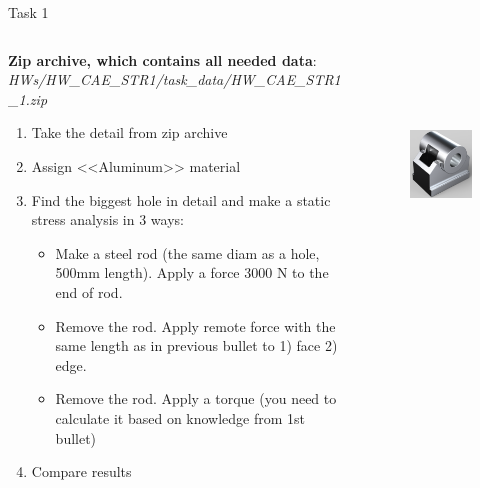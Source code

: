 \documentclass[aspectratio=169]{beamer}
\begin{document}
\begin{frame}[t]{Task 1}
    \vspace{-0.4cm}
    \begin{columns}[T,onlytextwidth]
        \begin{column}{0.59\textwidth}
            \scriptsize
            \textbf{Zip archive, which contains all needed data}: \textit{HWs/HW\_CAE\_STR1/task\_data/HW\_CAE\_STR1\_1.zip}
            \begin{enumerate}
                \item Take the detail from zip archive
                \item Assign <<Aluminum>> material
                \item Find the biggest hole in detail and make a static stress analysis in 3 ways:
                      \begin{itemize}
                        \scriptsize
                          \item Make a steel rod (the same diam as a hole, 500mm length). Apply a force 3000 N to the end of rod.
                          \item Remove the rod. Apply remote force with the same length as in previous bullet to 1) face 2) edge.
                          \item Remove the rod. Apply a torque (you need to calculate it based on knowledge from 1st bullet)
                      \end{itemize}
                \item Compare results
            \end{enumerate}
        \end{column}
        \begin{column}{0.39\textwidth}
            \begin{figure}[H]
                \centering\includegraphics[height=6cm,width=1\textwidth,keepaspectratio]{HW_CAE_STR1_1.png}
                \label{fig:HW_CAE_STR1_1.png}
            \end{figure}
        \end{column}
    \end{columns}
\end{frame}
\end{document}
